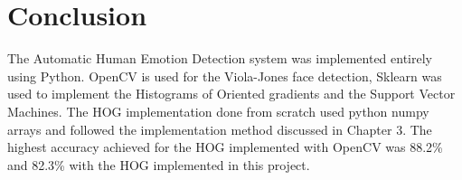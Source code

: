 \section{Conclusion}
The Automatic Human Emotion Detection system was implemented entirely using Python. OpenCV is used for the Viola-Jones face detection, Sklearn was used to implement the Histograms of Oriented gradients and the Support Vector Machines. The HOG implementation done from scratch used python numpy arrays and followed the implementation method discussed in Chapter 3. The highest accuracy achieved for the HOG implemented with OpenCV was 88.2\% and 82.3\% with the HOG implemented in this project. 



